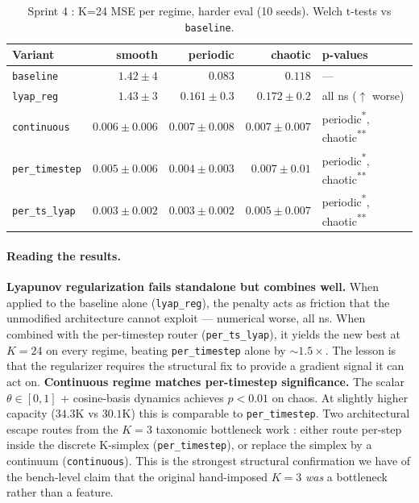 \documentclass[11pt,a4paper]{article}
\begin{document}
\begin{table}[h]
\centering
\caption{Sprint 4 : K=24 MSE per regime, harder eval (10 seeds).
Welch t-tests vs \texttt{baseline}.}
\label{tab:sprint4-summary}
\begin{tabular}{lrrrl}
\toprule
Variant & smooth & periodic & chaotic & p-values \\
\midrule
\texttt{baseline}    & $1.42 \pm 4$       & $0.083$    & $0.118$  & — \\
\texttt{lyap\_reg}   & $1.43 \pm 3$       & $0.161 \pm 0.3$ & $0.172 \pm 0.2$ & all ns ($\uparrow$ worse) \\
\texttt{continuous}  & $0.006 \pm 0.006$  & $0.007 \pm 0.008$ & $0.007 \pm 0.007$ & periodic\textsuperscript{*}, chaotic\textsuperscript{**} \\
\texttt{per\_timestep} & $0.005 \pm 0.006$  & $0.004 \pm 0.003$ & $0.007 \pm 0.01$  & periodic\textsuperscript{*}, chaotic\textsuperscript{**} \\
\texttt{per\_ts\_lyap} & $\bm{0.003 \pm 0.002}$ & $\bm{0.003 \pm 0.002}$ & $\bm{0.005 \pm 0.007}$ & periodic\textsuperscript{*}, chaotic\textsuperscript{**} \\
\bottomrule
\end{tabular}
\end{table}

\paragraph{Reading the results.}
\textbf{Lyapunov regularization fails standalone but combines well.}
When applied to the baseline alone (\texttt{lyap\_reg}), the
penalty acts as friction that the unmodified architecture cannot
exploit --- numerical worse, all ns. When combined with the
per-timestep router (\texttt{per\_ts\_lyap}), it yields the new
best at $K{=}24$ on every regime, beating
\texttt{per\_timestep} alone by $\sim 1.5{\times}$. The lesson is
that the regularizer requires the structural fix to provide a
gradient signal it can act on.
\textbf{Continuous regime matches per-timestep significance.} The
scalar $\theta \in [0, 1]$ + cosine-basis dynamics achieves
$p{<}0.01$ on chaos. At slightly higher capacity ($34.3$K vs
$30.1$K) this is comparable to \texttt{per\_timestep}. Two
architectural escape routes from the $K{=}3$ taxonomic bottleneck
work : either route per-step inside the discrete K-simplex
(\texttt{per\_timestep}), or replace the simplex by a continuum
(\texttt{continuous}). This is the strongest structural
confirmation we have of the bench-level claim that the original
hand-imposed $K{=}3$ \emph{was} a bottleneck rather than a feature.
\end{document}
